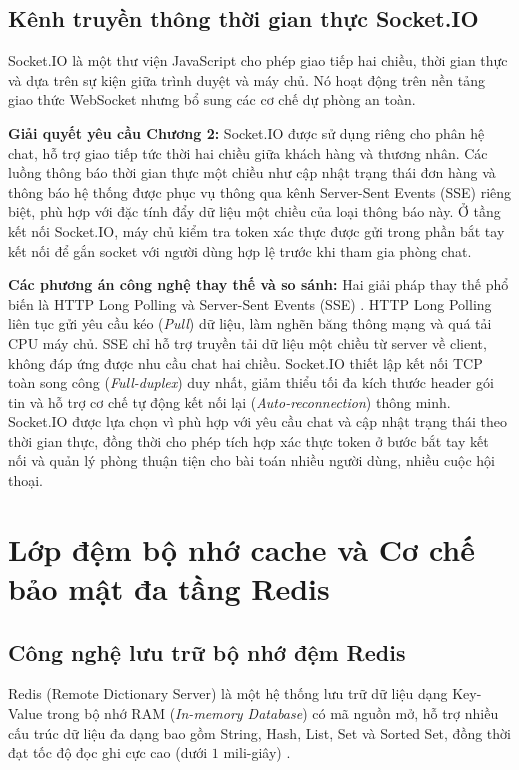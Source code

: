 \documentclass[../DoAn.tex]{subfiles}
\begin{document}
\subsection{Kênh truyền thông thời gian thực Socket.IO}
Socket.IO là một thư viện JavaScript cho phép giao tiếp hai chiều, thời gian thực và dựa trên sự kiện giữa trình duyệt và máy chủ. Nó hoạt động trên nền tảng giao thức WebSocket nhưng bổ sung các cơ chế dự phòng an toàn.

\textbf{Giải quyết yêu cầu Chương 2:}
Socket.IO được sử dụng riêng cho phân hệ chat, hỗ trợ giao tiếp tức thời hai chiều giữa khách hàng và thương nhân. Các luồng thông báo thời gian thực một chiều như cập nhật trạng thái đơn hàng và thông báo hệ thống được phục vụ thông qua kênh Server-Sent Events (SSE) riêng biệt, phù hợp với đặc tính đẩy dữ liệu một chiều của loại thông báo này. Ở tầng kết nối Socket.IO, máy chủ kiểm tra token xác thực được gửi trong phần bắt tay kết nối để gắn socket với người dùng hợp lệ trước khi tham gia phòng chat.

\textbf{Các phương án công nghệ thay thế và so sánh:}
Hai giải pháp thay thế phổ biến là HTTP Long Polling và Server-Sent Events (SSE) \cite{websocket-standard}. HTTP Long Polling liên tục gửi yêu cầu kéo (\textit{Pull}) dữ liệu, làm nghẽn băng thông mạng và quá tải CPU máy chủ. SSE chỉ hỗ trợ truyền tải dữ liệu một chiều từ server về client, không đáp ứng được nhu cầu chat hai chiều. Socket.IO thiết lập kết nối TCP toàn song công (\textit{Full-duplex}) duy nhất, giảm thiểu tối đa kích thước header gói tin và hỗ trợ cơ chế tự động kết nối lại (\textit{Auto-reconnection}) thông minh. Socket.IO được lựa chọn vì phù hợp với yêu cầu chat và cập nhật trạng thái theo thời gian thực, đồng thời cho phép tích hợp xác thực token ở bước bắt tay kết nối và quản lý phòng thuận tiện cho bài toán nhiều người dùng, nhiều cuộc hội thoại.

\section{Lớp đệm bộ nhớ cache và Cơ chế bảo mật đa tầng Redis}
\label{section:3.3}

\subsection{Công nghệ lưu trữ bộ nhớ đệm Redis}
Redis (Remote Dictionary Server) là một hệ thống lưu trữ dữ liệu dạng Key-Value trong bộ nhớ RAM (\textit{In-memory Database}) có mã nguồn mở, hỗ trợ nhiều cấu trúc dữ liệu đa dạng bao gồm String, Hash, List, Set và Sorted Set, đồng thời đạt tốc độ đọc ghi cực cao (dưới $1$ mili-giây) \cite{redis-vs-memcached}.
\end{document}

